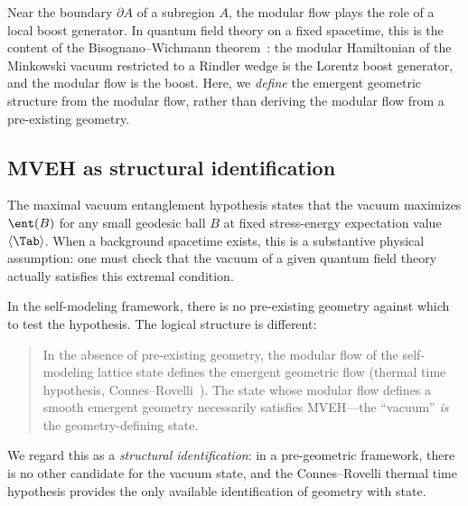 Near the boundary $\partial A$ of a subregion $A$, the modular flow
plays the role of a local boost generator.  In quantum field theory on
a fixed spacetime, this is the content of the Bisognano--Wichmann
theorem~\cite{BisognanoWichmann1976}: the modular Hamiltonian of the
Minkowski vacuum restricted to a Rindler wedge is the Lorentz boost
generator, and the modular flow is the boost.  Here, we \emph{define}
the emergent geometric structure from the modular flow, rather than
deriving the modular flow from a pre-existing geometry.

\subsection{MVEH as structural identification}
\label{sec:mveh}

The maximal vacuum entanglement hypothesis states that the vacuum
maximizes $\ent(B)$ for any small geodesic ball $B$ at fixed
stress-energy expectation value $\langle\Tab\rangle$.  When a
background spacetime exists, this is a substantive physical
assumption: one must check that the vacuum of a given quantum field
theory actually satisfies this extremal condition.

In the self-modeling framework, there is no pre-existing geometry
against which to test the hypothesis.  The logical structure is
different:

\begin{quote}
In the absence of pre-existing geometry, the modular flow of the
self-modeling lattice state defines the emergent geometric flow
(thermal time hypothesis,
Connes--Rovelli~\cite{ConnesRovelli1994}).  The state whose
modular flow defines a smooth emergent geometry necessarily
satisfies MVEH---the ``vacuum'' \emph{is} the geometry-defining
state.
\end{quote}

We regard this as a \emph{structural identification}: in a pre-geometric
framework, there is no other candidate for the vacuum state, and the
Connes--Rovelli thermal time hypothesis provides the only available
identification of geometry with state.

